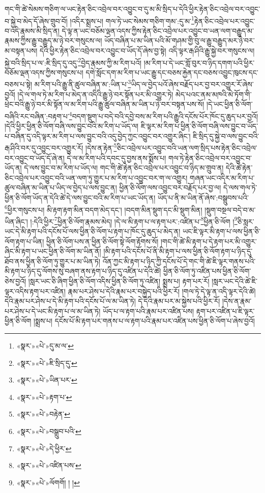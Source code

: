 གང་གི་ཚེ་སེམས་གཅིག་ལ་ཡང་རྟེན་ཅིང་འབྲེལ་བར་འབྱུང་བ་དུ་མ་མི་སྲིད་པ་དེའི་ཕྱིར་རྟེན་ཅིང་འབྲེལ་བར་འབྱུང་བ་སྐྱེ་བ་མེད་དོ་ཞེས་གྲུབ་བོ། །འདིར་སྨྲས་པ། གལ་ཏེ་ཡང་སེམས་གཅིག་གམ་:དུ་མ་\footnote{«སྣར་»«པེ་»དུ་མ་ལ་}རྟེན་ཅིང་འབྲེལ་པར་འབྱུང་བ་འདི་རྣམས་མི་སྲིད་ན། དེ་ལྟ་ན་ཡང་བཅོམ་ལྡན་འདས་ཀྱིས་རྟེན་ཅིང་འབྲེལ་པར་འབྱུང་བ་ཡན་ལག་བརྒྱུད་མ་རྣམས་ཀྱིས་རྒྱུ་བརྒྱུད་མ་ཉེ་བར་གསུངས་ལ། ཡོད་བཞིན་པ་མ་ཡིན་པའི་མོ་གཤམ་གྱི་བུ་ལ་རྒྱུ་བརྒྱུད་མར་ཉེ་བར་མ་བསྟན་པས། དེའི་ཕྱིར་རྟེན་ཅིང་འབྲེལ་བར་འབྱུང་བ་ཡོད་དོ་ཞེས་བྱ་སྟེ། འདི་ལྟར་རྒ་ཤིའི་རྒྱུ་སྐྱེ་བར་གསུངས་ལ། སྐྱེ་བའི་སྲིད་པ་ལ་:ཇི་སྲིད་དུ་འདུ་\footnote{«སྣར་»«པེ་»ཇི་སྲིད་དུ་}བྱེད་རྣམས་ཀྱི་མ་རིག་པའོ། །མ་རིག་པ་དེ་ཡང་གློ་བུར་བ་ཉིད་དགག་པའི་ཕྱིར་བཅོམ་ལྡན་འདས་ཀྱིས་གསུངས་པ། དགེ་སློང་དག་མ་རིག་པ་ཡང་རྒྱུ་དང་བཅས་རྐྱེན་དང་བཅས་འབྱུང་ཁུངས་དང་བཅས་པ་སྟེ། མ་རིག་པའི་རྒྱུ་ནི་ཚུལ་བཞིན་མ་:ཡིན་པ་\footnote{«སྣར་»«པེ་»ཡིན་པར་}ཡིད་ལ་བྱེད་པའོ་ཞེས་བརྗོད་པར་བྱ་བར་འགྱུར་རོ་ཞེས་བྱའོ། །དེ་ལ་གལ་ཏེ་མ་རིག་པ་མེད་ན་འདིའི་རྒྱུ་ཉེ་བར་སྟོན་པར་མི་འགྱུར་ཏེ། མེད་པའང་ནམ་མཁའི་མེ་ཏོག་གི་ཕྲེང་བའི་རྒྱུ་ཉེ་བར་མི་སྟོན་ལ་མ་རིག་པའི་རྒྱུ་ཚུལ་བཞིན་མ་ཡིན་པ་ཉེ་བར་བསྟན་པས་སོ། །དེ་ཡང་ཕྱིན་ཅི་ལོག་བཞིའི་རང་བཞིན་:བརྟག་པ་\footnote{«སྣར་»«པེ་»རྟག་པ་}བདག་སྡུག་པ་བདེ་བའི་དབྱེ་བས་མ་རིག་པའི་རྒྱུའི་དངོས་པོར་ཁོང་དུ་ཆུད་པར་བྱའོ། །དེའི་ཕྱིར་ཕྱིན་ཅི་ལོག་བཞི་ལས་བྱུང་བའི་མ་རིག་པ་ཡོད་ལ། ཇི་ལྟར་མ་རིག་པ་ཕྱིན་ཅི་ལོག་བཞི་ལས་བྱུང་བ་ཡོད་པ་བཞིན་དུ་འདི་ལྟར་མ་རིག་པ་ལས་བྱུང་བའི་འདུ་བྱེད་ཀྱང་འབྱུང་བར་འགྱུར་ཞིང་། ཇི་སྲིད་དུ་སྐྱེ་བ་ལས་བྱུང་བའི་རྒ་ཤིའི་བར་དུ་འབྱུང་བར་འགྱུར་རོ། །དེས་ན་རྟེན་\footnote{«སྣར་»«པེ་»བརྟེན་}ཅིང་འབྲེལ་པར་འབྱུང་བའི་ཡན་ལག་སྲིད་པས་རྟེན་ཅིང་འབྲེལ་བར་འབྱུང་བ་ཡོད་དོ་ཞེ་ན། དེ་ལ་མ་རིག་པའི་དབང་དུ་བྱས་ནས་སྨོས་པ། གལ་ཏེ་རྟེན་ཅིང་འབྲེལ་བར་འབྱུང་བ་ཡོད་ན། དེ་ལས་བྱུང་བ་མ་རིག་པ་ཡོད་ལ། གང་གི་ཚེ་རྟེན་ཅིང་འབྲེལ་པར་འབྱུང་བ་ཉིད་མ་གྲུབ་ན། དེའི་ཚེ་རྟེན་ཅིང་འབྲེལ་པར་འབྱུང་བའི་ཡན་ལག་ཏུ་གྱུར་པ་མ་རིག་པ་འབྱུང་བར་ག་ལ་འགྱུར། གཞན་ཡང་འདིར་མ་རིག་པ་ཚུལ་བཞིན་མ་ཡིན་པ་ཡིད་ལ་བྱེད་པ་ལས་བྱུང་ན། ཕྱིན་ཅི་ལོག་ལས་འབྱུང་བར་བརྗོད་པར་བྱ་ལ། དེ་ལས་གལ་ཏེ་ཕྱིན་ཅི་ལོག་ཡོད་ན་དེའི་ཚེ་དེ་ལས་བྱུང་བའི་མ་རིག་པ་ཡང་ཡོད་ན། ཡོད་པ་ནི་མ་ཡིན་ནོ་ཞེས་:བསྒྲུབས་པའི་\footnote{«སྣར་»«པེ་»བསྒྲུབ་པའི་}ཕྱིར་གསུངས་པ། མི་རྟག་རྟག་མིན་བདག་མེད་དང་། །བདག་མིན་སྡུག་དང་མི་སྡུག་མིན། །སྡུག་བསྔལ་བདེ་བ་མ་ཡིན་ཞིང་། །:དེའི་ཕྱིར་\footnote{«སྣར་»«པེ་»དེ་ཕྱིར་}ཕྱིན་ཅི་ལོག་རྣམས་མེད། །དེ་ལ་མི་རྟག་པ་ལ་རྟག་པར་:འཛིན་པ་\footnote{«སྣར་»«པེ་»འཛིན་པས་}ཕྱིན་ཅི་ལོག །\footnote{«སྣར་»«པེ་»ལོགགོ། ། །}ཅི་སླར་ཡང་དེ་མི་རྟག་པའི་དངོས་པོ་ལས་ཕྱིན་ཅི་ལོག་པ་རྟག་པ་ཁོང་དུ་ཆུད་པ་མེད་ན། ཡང་ཇི་ལྟར་མི་རྟག་པ་ལས་ཕྱིན་ཅི་ལོག་རྟག་པ་ཡིན། ཕྱིན་ཅི་ལོག་པས་ན་ཕྱིན་ཅི་ལོག་སྟེ་ལོག་རྟོགས་སོ། །གང་གི་ཚེ་མི་རྟག་པ་དེ་རྟག་པར་མི་འགྱུར་ཞིང་མི་རྟག་པ་ཡང་ཕྱིན་ཅི་ལོག་མ་ཡིན་ནོ། །མི་རྟག་པའི་དངོས་པོ་ནི་མི་རྟག་པ་ལས་ཕྱིན་ཅི་ལོག་རྟག་པ་ཉིད་དུ་ཐོབ་ནས་ཕྱིན་ཅི་ལོག་ཏུ་གྱུར་པ་མ་ཡིན་ཏེ། འོན་ཀྱང་མི་རྟག་པ་ཉིད་ཀྱི་དངོས་པོ་དེ་གང་གི་ཚེ་ཇི་ལྟར་གནས་པའི་མི་རྟག་པ་ཉིད་དུ་ལོགས་སུ་བཞག་ནས་རྟག་པ་ཉིད་དུ་འཛིན་པ་དེའི་ཚེ། ཕྱིན་ཅི་ལོག་ཏུ་འཛིན་པས་ཕྱིན་ཅི་ལོག་ཅེས་བྱའོ། །སླར་ཡང་ཅི་ཞིག་ཕྱིན་ཅི་ལོག་འདིས་ཕྱིན་ཅི་ལོག་ཏུ་འཛིན། སྨྲས་པ། རྟག་པར་རོ། །སླར་ཡང་དེའི་ཚེ་ཇི་ལྟར་འདིས་རྟག་པར་འཛིན། རྣམ་པར་ཤེས་པ་དེའི་རྣམ་པར་བསྐྱེད་པའི་ཕྱིར་རོ། །གལ་ཏེ་དེ་ལྟ་ན་འདི་ལྟར་དེའི་ཚེ། དེའི་རྣམ་པར་ཤེས་པ་དེ་མི་རྟག་པའི་དངོས་པོ་ལ་མ་ཡིན་ཏེ། དེ་དེའི་རྣམ་པར་མ་སྐྱེས་པའི་ཕྱིར་རོ། །དེས་ན་རྣམ་པར་ཤེས་པ་དེ་ཡང་མི་རྟག་པ་ལ་མ་ཡིན་ཏེ། ཡོད་པ་ལ་རྟག་པའི་རྣམ་པར་འཛིན་པས། རྟག་པར་འཛིན་པ་ཇི་ལྟར་ཕྱིན་ཅི་ལོག །སྨྲས་པ། དངོས་པོ་མི་རྟག་པར་གནས་པ་ལ་རྟག་པའི་རྣམ་པར་འཛིན་པས་ཕྱིན་ཅི་ལོག་པ་ཞེས་བྱའོ། 